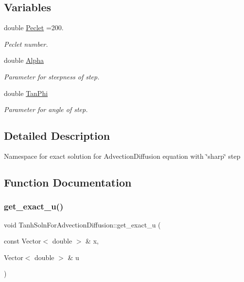 \subsection*{Variables}
\begin{DoxyCompactItemize}
\item 
double \hyperlink{namespaceTanhSolnForAdvectionDiffusion_aeba486af70e92ab7eec1da3ce44d51ee}{Peclet} =200.
\begin{DoxyCompactList}\small\item\em Peclet number. \end{DoxyCompactList}\item 
double \hyperlink{namespaceTanhSolnForAdvectionDiffusion_a4d202e8ac48cc75f760ef40681402ec7}{Alpha}
\begin{DoxyCompactList}\small\item\em Parameter for steepness of step. \end{DoxyCompactList}\item 
double \hyperlink{namespaceTanhSolnForAdvectionDiffusion_a236bf82c661189623706b7c9d9b0c52f}{Tan\+Phi}
\begin{DoxyCompactList}\small\item\em Parameter for angle of step. \end{DoxyCompactList}\end{DoxyCompactItemize}


\subsection{Detailed Description}
Namespace for exact solution for Advection\+Diffusion equation with \char`\"{}sharp\char`\"{} step 

\subsection{Function Documentation}
\mbox{\label{namespaceTanhSolnForAdvectionDiffusion_ae4c9ed0a4f123ec8e634f0cc45bfcebc}} 
\subsubsection{\texorpdfstring{get\+\_\+exact\+\_\+u()}{get\_exact\_u()}\hspace{0.1cm}{\footnotesize\ttfamily [1/2]}}
{\footnotesize\ttfamily void Tanh\+Soln\+For\+Advection\+Diffusion\+::get\+\_\+exact\+\_\+u (\begin{DoxyParamCaption}\item[{const Vector$<$ double $>$ \&}]{x,  }\item[{Vector$<$ double $>$ \&}]{u }\end{DoxyParamCaption})}




